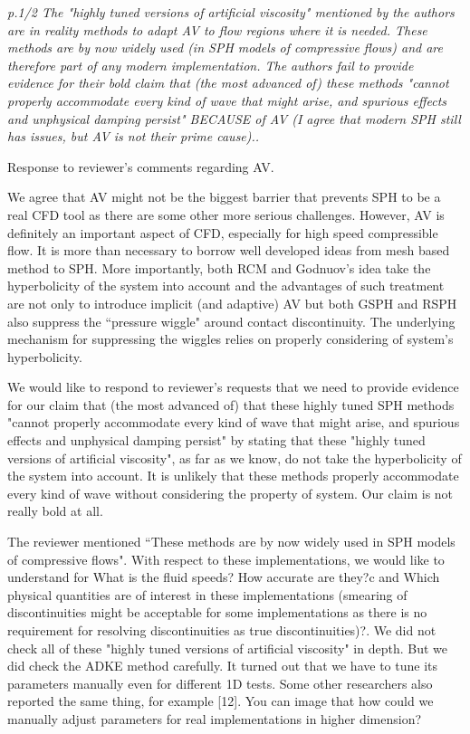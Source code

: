 \documentclass[10pt,a4paper]{article}
\begin{document}
\textit{p.1/2 The "highly tuned versions of artificial viscosity" mentioned by the authors are in reality methods to adapt AV to flow regions where it is needed. These methods are by now widely used (in SPH models of compressive flows) and are therefore part of any modern implementation.
The authors fail to provide evidence for their bold claim that (the most advanced of) these methods "cannot properly accommodate every kind of wave that might arise, and spurious effects and unphysical damping persist" BECAUSE of AV (I agree that modern SPH still has issues, but AV is not their prime cause)..}

Response to reviewer's comments regarding AV.

We agree that AV might not be the biggest barrier that prevents SPH to be a real CFD tool as there are some other more serious challenges. However, AV is definitely an important aspect of CFD, especially for high speed compressible flow. It is more than necessary to borrow well developed ideas from mesh based method to SPH.
More importantly, both RCM and Godnuov's idea take the hyperbolicity of the system into account and the advantages of such treatment are not only to introduce implicit (and adaptive) AV but both GSPH and RSPH also suppress the ``pressure wiggle" around contact discontinuity. The underlying mechanism for suppressing the wiggles  relies on properly considering of system's hyperbolicity.

We would like to respond to reviewer's requests that we need to provide evidence for our claim that (the most advanced of) that these highly tuned SPH methods "cannot properly accommodate every kind of wave that might arise, and spurious effects and unphysical damping persist" by stating that 
these "highly tuned versions of artificial viscosity", as far as we know, do not take the hyperbolicity of the system into account. It is unlikely that these methods properly accommodate every kind of wave without considering the property of system. Our claim is not really bold at all.

The reviewer mentioned ``These methods are by now widely used in SPH models of compressive flows". With respect to these implementations, we  would like to understand for What is the fluid speeds? How accurate are they?c and Which physical quantities are of interest in these implementations (smearing of discontinuities might be acceptable for some implementations as there is no requirement for resolving discontinuities as true discontinuities)?.
We did not check all of these "highly tuned versions of artificial viscosity" in depth. But we did check the ADKE method carefully. It turned out that we have to tune its parameters manually even for different 1D tests. Some other researchers also reported the same thing, for example [12]. You can image that how could we manually adjust parameters for real implementations in higher dimension?
\\[3pt]
 
\end{document}
